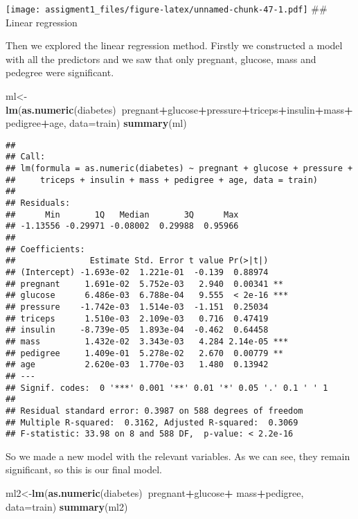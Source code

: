 \documentclass[
]{article}
\newenvironment{Shaded}{\begin{snugshade}}{\end{snugshade}}
\newcommand{\DataTypeTok}[1]{\textcolor[rgb]{0.13,0.29,0.53}{#1}}
\newcommand{\KeywordTok}[1]{\textcolor[rgb]{0.13,0.29,0.53}{\textbf{#1}}}
\newcommand{\NormalTok}[1]{#1}
\newcommand{\OperatorTok}[1]{\textcolor[rgb]{0.81,0.36,0.00}{\textbf{#1}}}
\newcommand{\StringTok}[1]{\textcolor[rgb]{0.31,0.60,0.02}{#1}}
\begin{document}
\texttt{[image: assigment1\_files/figure-latex/unnamed-chunk-47-1.pdf]}
\#\# Linear regression

Then we explored the linear regression method. Firstly we constructed a
model with all the predictors and we saw that only pregnant, glucose,
mass and pedegree were significant.

\begin{Shaded}
\begin{Highlighting}[]
\NormalTok{ml<-}\KeywordTok{lm}\NormalTok{(}\KeywordTok{as.numeric}\NormalTok{(diabetes)}\OperatorTok{~}\NormalTok{pregnant}\OperatorTok{+}\NormalTok{glucose}\OperatorTok{+}\NormalTok{pressure}\OperatorTok{+}\NormalTok{triceps}\OperatorTok{+}\NormalTok{insulin}\OperatorTok{+}\NormalTok{mass}\OperatorTok{+}\NormalTok{pedigree}\OperatorTok{+}\NormalTok{age, }\DataTypeTok{data=}\NormalTok{train)}
\KeywordTok{summary}\NormalTok{(ml)}
\end{Highlighting}
\end{Shaded}

\begin{verbatim}
## 
## Call:
## lm(formula = as.numeric(diabetes) ~ pregnant + glucose + pressure + 
##     triceps + insulin + mass + pedigree + age, data = train)
## 
## Residuals:
##      Min       1Q   Median       3Q      Max 
## -1.13556 -0.29971 -0.08002  0.29988  0.95966 
## 
## Coefficients:
##               Estimate Std. Error t value Pr(>|t|)    
## (Intercept) -1.693e-02  1.221e-01  -0.139  0.88974    
## pregnant     1.691e-02  5.752e-03   2.940  0.00341 ** 
## glucose      6.486e-03  6.788e-04   9.555  < 2e-16 ***
## pressure    -1.742e-03  1.514e-03  -1.151  0.25034    
## triceps      1.510e-03  2.109e-03   0.716  0.47419    
## insulin     -8.739e-05  1.893e-04  -0.462  0.64458    
## mass         1.432e-02  3.343e-03   4.284 2.14e-05 ***
## pedigree     1.409e-01  5.278e-02   2.670  0.00779 ** 
## age          2.620e-03  1.770e-03   1.480  0.13942    
## ---
## Signif. codes:  0 '***' 0.001 '**' 0.01 '*' 0.05 '.' 0.1 ' ' 1
## 
## Residual standard error: 0.3987 on 588 degrees of freedom
## Multiple R-squared:  0.3162, Adjusted R-squared:  0.3069 
## F-statistic: 33.98 on 8 and 588 DF,  p-value: < 2.2e-16
\end{verbatim}

So we made a new model with the relevant variables. As we can see, they
remain significant, so this is our final model.

\begin{Shaded}
\begin{Highlighting}[]
\NormalTok{ml2<-}\KeywordTok{lm}\NormalTok{(}\KeywordTok{as.numeric}\NormalTok{(diabetes)}\OperatorTok{~}\NormalTok{pregnant}\OperatorTok{+}\NormalTok{glucose}\OperatorTok{+}\StringTok{ }\NormalTok{mass}\OperatorTok{+}\NormalTok{pedigree, }\DataTypeTok{data=}\NormalTok{train)}
\KeywordTok{summary}\NormalTok{(ml2)}
\end{Highlighting}
\end{Shaded}
\end{document}
